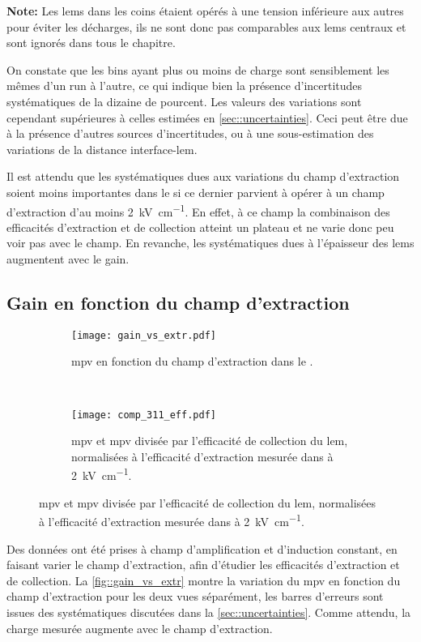         \textbf{Note:} Les \glspl{lem} dans les coins étaient opérés à une tension inférieure aux autres pour éviter les décharges, ils ne sont donc pas comparables aux \glspl{lem} centraux et sont ignorés dans tous le chapitre.
    
        On constate que les bins ayant plus ou moins de charge sont sensiblement les mêmes d'un run à l'autre, ce qui indique bien la présence d'incertitudes systématiques de la dizaine de pourcent. Les valeurs des variations sont cependant supérieures à celles estimées en \autoref{sec::uncertainties}. Ceci peut être due à la présence d'autres sources d'incertitudes, ou à une sous-estimation des variations de la distance interface-\gls{lem}.

        Il est attendu que les systématiques dues aux variations du champ d'extraction soient moins importantes dans le \SSS{} si ce dernier parvient à opérer à un champ d'extraction d'au moins \SI{2}{\kilo\volt\per\centi\meter}. En effet, à ce champ la combinaison des efficacités d'extraction et de collection atteint un plateau et ne varie donc peu voir pas avec le champ. En revanche, les systématiques dues à l'épaisseur des \glspl{lem} augmentent avec le gain. 

    \subsection{Gain en fonction du champ d'extraction}\label{sec::result_extr}


      \begin{figure}[htbp]
        \centering
        \begin{subfigure}[t]{0.9\textwidth}
          \centering
          \texttt{[image: gain\_vs\_extr.pdf]}
        \caption[\gls{mpv} en fonction du champ d'extraction dans le \TOO{}.]{\label{fig::gain_vs_extr}\gls{mpv} en fonction du champ d'extraction dans le \TOO{}.}
        \end{subfigure}\\
        \begin{subfigure}[t]{0.9\textwidth}
          \centering
          \texttt{[image: comp\_311\_eff.pdf]}
          \caption[\gls{mpv} et \gls{mpv} divisée par l'efficacité de collection du \gls{lem}, normalisées à l'efficacité d'extraction mesurée dans \cite{guschin} à \SI{2}{\kilo\volt\per\centi\meter}.]{\label{fig::comp_311_eff}\gls{mpv} et \gls{mpv} divisée par l'efficacité de collection du \gls{lem}, normalisées à l'efficacité d'extraction mesurée dans \cite{guschin} à \SI{2}{\kilo\volt\per\centi\meter}.}
        \end{subfigure}
      \end{figure}
      Des données ont été prises à champ d'amplification et d'induction constant, en faisant varier le champ d'extraction, afin d'étudier les efficacités d'extraction et de collection. La \autoref{fig::gain_vs_extr} montre la variation du \gls{mpv} en fonction du champ d'extraction pour les deux vues séparément, les barres d'erreurs sont issues des systématiques discutées dans la \autoref{sec::uncertainties}. Comme attendu, la charge mesurée augmente avec le champ d'extraction.

